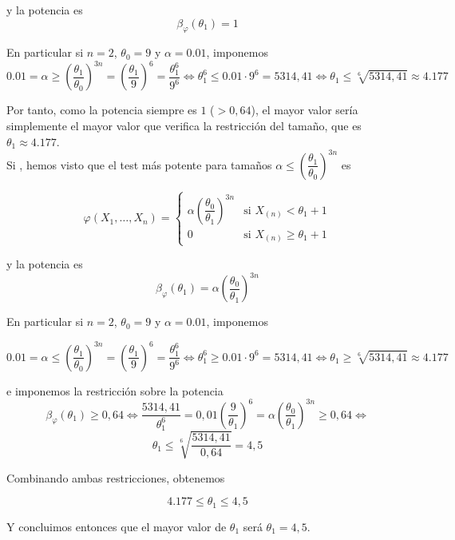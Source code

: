 \documentclass[12pt]{article}
\begin{document}
\begin{ejercicio}[2 puntos]
        y la potencia es $$\beta_{\varphi}(\theta_1) = 1$$

        En particular si $n = 2$, $\theta_0 = 9$ y $\alpha = 0.01$, imponemos
        $$0.01 = \alpha \geq \left( \dfrac{\theta_1}{\theta_0} \right)^{3n} = \left( \dfrac{\theta_1}{9} \right)^{6} = \dfrac{\theta_1^6}{9^6} \iff \theta_1^6 \leq 0.01 \cdot 9^6 = 5314,41 \iff
        \theta_1 \leq \sqrt[6]{5314,41} \approx 4.177$$

        Por tanto, como la potencia siempre es $1$ ($>0,64$), el mayor valor sería simplemente el mayor valor que verifica
        la restricción del tamaño, que es $\theta_1 \approx 4.177$. \\

        Si , hemos visto que el test más potente para tamaños $\alpha \leq \left( \dfrac{\theta_1}{\theta_0} \right)^{3n}$ es

        $$\varphi(X_1, \ldots, X_n) = 
        \begin{cases}
            \alpha \left( \dfrac{\theta_0}{\theta_1} \right)^{3n} &\text{si } X_{(n)} < \theta_1 + 1 \\
            0 &\text{si } X_{(n)} \geq \theta_1 + 1
        \end{cases}$$

        y la potencia es $$\beta_{\varphi}(\theta_1) = \alpha \left( \dfrac{\theta_0}{\theta_1} \right)^{3n}$$

        En particular si $n = 2$, $\theta_0 = 9$ y $\alpha = 0.01$, imponemos

        $$0.01 = \alpha \leq \left( \dfrac{\theta_1}{\theta_0} \right)^{3n} = \left( \dfrac{\theta_1}{9} \right)^{6} = \dfrac{\theta_1^6}{9^6} \iff \theta_1^6 \geq 0.01 \cdot 9^6 = 5314,41 \iff
        \theta_1 \geq \sqrt[6]{5314,41} \approx 4.177$$

        e imponemos la restricción sobre la potencia 
        $$\beta_{\varphi}(\theta_1) \geq 0,64 \iff \dfrac{5314,41}{\theta_1^6} = 0,01 \left( \dfrac{9}{\theta_1} \right)^{6}  = \alpha \left( \dfrac{\theta_0}{\theta_1} \right)^{3n} \geq 0,64 \iff $$
        $$\theta_1 \leq \sqrt[6]{\dfrac{5314,41}{0,64}} = 4,5$$

        Combinando ambas restricciones, obtenemos

        $$4.177 \leq \theta_1 \leq 4,5$$

        Y concluimos entonces que el mayor valor de $\theta_1$ será $\theta_1 = 4,5$.

    \end{ejercicio}
\end{document}

